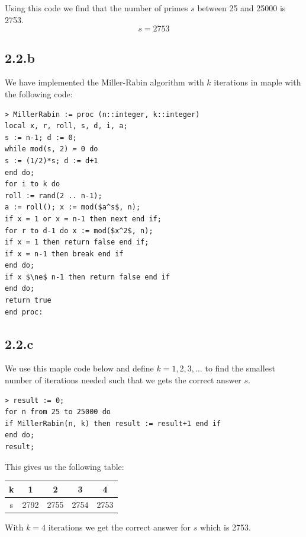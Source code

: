 \documentclass[11pt]{report}
\begin{document}
Using this code we find that the number of primes $s$ between 25 and 25000 is 2753.
$$s = 2753$$

\subsection*{2.2.b}
We have implemented the Miller-Rabin algorithm with $k$ iterations in maple with the following code:

\begin{lstlisting}[style=Maple]
> MillerRabin := proc (n::integer, k::integer)
local x, r, roll, s, d, i, a;
s := n-1; d := 0;
while mod(s, 2) = 0 do
s := (1/2)*s; d := d+1
end do;
for i to k do
roll := rand(2 .. n-1);
a := roll(); x := mod($a^s$, n);
if x = 1 or x = n-1 then next end if;
for r to d-1 do x := mod($x^2$, n);
if x = 1 then return false end if;
if x = n-1 then break end if
end do;
if x $\ne$ n-1 then return false end if
end do;
return true
end proc:
\end{lstlisting}

\subsection*{2.2.c}
We use this maple code below and define $k = 1,2,3,\dots$ to find the smallest number of iterations needed such that we gets the correct answer $s$.

\begin{lstlisting}[style=Maple]
> result := 0;
for n from 25 to 25000 do
if MillerRabin(n, k) then result := result+1 end if
end do;
result;
\end{lstlisting}

This gives us the following table:
\begin{center}
\begin{tabular}{| c | c | c | c | c |}
\hline
k & 1 & 2 & 3 & 4 \\ \hline
s & 2792 & 2755 & 2754 & 2753 \\ \hline
\end{tabular}
\end{center}
With $k = 4$ iterations we get the correct answer for $s$ which is 2753.
\end{document}
